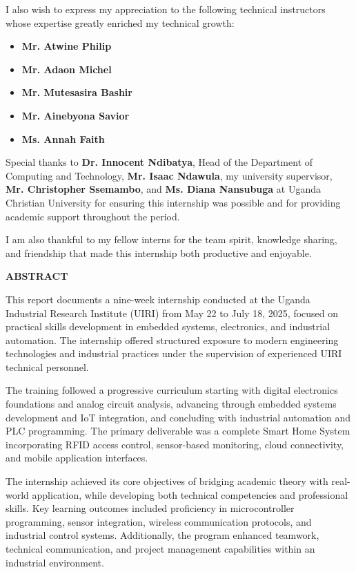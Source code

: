 \documentclass[12pt,a4paper]{report}
\begin{document}
\noindent I also wish to express my appreciation to the following technical instructors whose expertise greatly enriched my technical growth:
\begin{itemize}
    \item \textbf{Mr. Atwine Philip}
    \item \textbf{Mr. Adaon Michel}
    \item \textbf{Mr. Mutesasira Bashir}
    \item \textbf{Mr. Ainebyona Savior}
    \item \textbf{Ms. Annah Faith}
\end{itemize}

\noindent Special thanks to \textbf{Dr. Innocent Ndibatya}, Head of the Department of Computing and Technology, \textbf{Mr. Isaac Ndawula}, my university supervisor, \textbf{Mr. Christopher Ssemambo}, and \textbf{Ms. Diana Nansubuga} at Uganda Christian University for ensuring this internship was possible and for providing academic support throughout the period.

\noindent I am also thankful to my fellow interns for the team spirit, knowledge sharing, and friendship that made this internship both productive and enjoyable.

\newpage
{\fontsize{14}{16.8}\selectfont\bfseries\centering ABSTRACT\par}
\vspace{10pt}
\noindent This report documents a nine-week internship conducted at the Uganda Industrial Research Institute (UIRI) from May 22 to July 18, 2025, focused on practical skills development in embedded systems, electronics, and industrial automation. The internship offered structured exposure to modern engineering technologies and industrial practices under the supervision of experienced UIRI technical personnel.

\noindent The training followed a progressive curriculum starting with digital electronics foundations and analog circuit analysis, advancing through embedded systems development and IoT integration, and concluding with industrial automation and PLC programming. The primary deliverable was a complete Smart Home System incorporating RFID access control, sensor-based monitoring, cloud connectivity, and mobile application interfaces.

\noindent The internship achieved its core objectives of bridging academic theory with real-world application, while developing both technical competencies and professional skills. Key learning outcomes included proficiency in microcontroller programming, sensor integration, wireless communication protocols, and industrial control systems. Additionally, the program enhanced teamwork, technical communication, and project management capabilities within an industrial environment.
\end{document}
